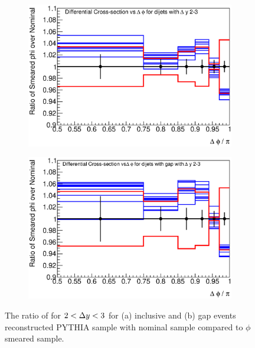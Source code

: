 \begin{figure}
\centering
        \begin{subfigure}[b]{0.5\textwidth}
                \centering
                \includegraphics[width=\textwidth]{figures/GBJ2/ResoPhi/RMS_phi___dPhi__2_3_Ratio.eps}
        \end{subfigure}%
        \begin{subfigure}[b]{0.5\textwidth}
                \centering
                \includegraphics[width=\textwidth]{figures/GBJ2/ResoPhi/RMS_phi___dPhi_gap__2_3_Ratio.eps}
        \end{subfigure}%
\caption[Uncertainty bands due to the jet $\phi$ resolution for \dphiDist{} for $2<\dy{}<3$]{
The ratio of \dphiDist{} for $2<\dy{}<3$ for (a) inclusive and (b) gap events reconstructed PYTHIA sample with nominal sample compared to $\phi$ smeared sample.
\label{GBJ2:ResoPhi:dphi23}}
\end{figure}


